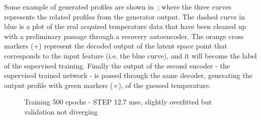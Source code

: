 Some example of generated profiles are shown in~\Figure{\ref{fig:step_12_7_rec}}; where the three curves represents the related profiles from the generator output. The dashed curve in blue is a plot of the real acquired temperature data that have been cleaned up with a preliminary passage through a recovery autoencoder. The orange cross markers (+) represent the decoded output of the latent space point that corresponds to the input feature (i.e. the blue curve), and it will become the label of the supervised training. Finally the output of the second encoder - the supervised trained network - is passed through the same decoder, generating the output profile with green markers ($\times$), of the guessed temperature.
\begin{figure}
    \centering
    \caption{ Training 500 epochs - STEP 12.7 mse, slightly overfitted but validation not diverging }
    \label{fig:step_12_7_rec}
\end{figure}
